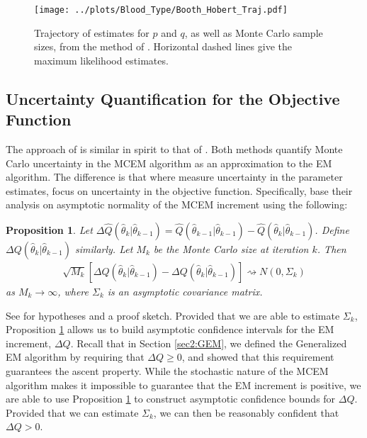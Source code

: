 \documentclass[11pt, oneside]{article}   	%
\newtheorem{proposition}{Proposition}[section]
\begin{document}
\begin{figure}
    \centering
    \caption{Trajectory of estimates for $p$ and $q$, as well as Monte Carlo sample sizes, from the method of \citeauthor{Boo99}. Horizontal dashed lines give the maximum likelihood estimates.}
    \label{fig2:blood_BH_traj}
    \texttt{[image: ../plots/Blood\_Type/Booth\_Hobert\_Traj.pdf]}   
\end{figure}






\subsection{Uncertainty Quantification for the Objective Function \citep{Caf05}}
\label{sec2:AMCEM}

The approach of \citet{Caf05} is similar in spirit to that of \citet{Boo99}. Both methods quantify Monte Carlo uncertainty in the MCEM algorithm as an approximation to the EM algorithm. The difference is that where \citeauthor{Boo99} measure uncertainty in the parameter estimates, \citeauthor{Caf05} focus on uncertainty in the objective function. Specifically, \citeauthor{Caf05} base their analysis on asymptotic normality of the MCEM increment using the following:
%
\begin{proposition}
    \label{thm2:Caf_normality}
    Let $\Delta \hat{Q}(\hat{\theta}_k|\hat{\theta}_{k-1}) = \hat{Q}(\hat{\theta}_{k-1}|\hat{\theta}_{k-1}) - \hat{Q}(\hat{\theta}_k|\hat{\theta}_{k-1})$. Define $\Delta Q(\hat{\theta}_k|\hat{\theta}_{k-1})$ similarly. Let $M_k$ be the Monte Carlo size at iteration $k$. Then
    \begin{align}
        \sqrt{M_k} \left[ \Delta \hat{Q}(\hat{\theta}_k|\hat{\theta}_{k-1}) - \Delta Q(\hat{\theta}_k|\hat{\theta}_{k-1}) \right] \rightsquigarrow N(0, \Sigma_k)
    \end{align}
    as $M_k \rightarrow \infty$, where $\Sigma_k$ is an asymptotic covariance matrix.
\end{proposition}

See \citeauthor{Caf05} for hypotheses and a proof sketch. Provided that we are able to estimate $\Sigma_k$, Proposition \ref{thm2:Caf_normality} allows us to build asymptotic confidence intervals for the EM increment, $\Delta Q$. Recall that in Section \ref{sec2:GEM}, we defined the Generalized EM algorithm by requiring that $\Delta Q \geq 0$, and showed that this requirement guarantees the ascent property. While the stochastic nature of the MCEM algorithm makes it impossible to guarantee that the EM increment is positive, we are able to use Proposition \ref{thm2:Caf_normality} to construct asymptotic confidence bounds for $\Delta Q$. Provided that we can estimate $\Sigma_k$, we can then be reasonably confident that $\Delta Q > 0$.
\end{document}
